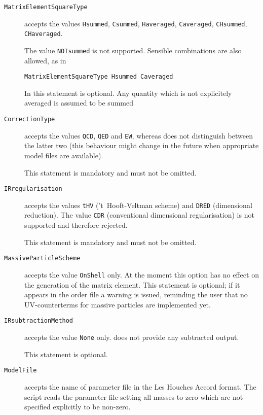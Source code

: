 \begin{description}
\item[\texttt{MatrixElementSquareType}] accepts the values
	\lstinline!Hsummed!, \lstinline!Csummed!,
	\lstinline!Haveraged!, \lstinline!Caveraged!,
	\lstinline!CHsummed!, \lstinline!CHaveraged!.

	The value \lstinline!NOTsummed! is not supported. 
	Sensible combinations are also allowed, as in
\begin{lstlisting}[language=olp]
MatrixElementSquareType Hsummed Caveraged
\end{lstlisting}

        In \gosamv{} this statement is optional.
	Any quantity which is not explicitely averaged is assumed to be
	summed
\item[\texttt{CorrectionType}] accepts the values
        \lstinline!QCD!, \lstinline!QED! and \lstinline!EW!, whereas
	\gosamv{} does not distinguish between the latter two (this behaviour
	might change in the future when appropriate model files are available).

	This statement is mandatory and must not be omitted.
\item[\texttt{IRregularisation}] accepts the values \lstinline!tHV!
        ('t~Hooft-Veltman scheme) and \lstinline!DRED! (dimensional reduction).
	The value \lstinline!CDR! (conventional dimensional regularisation)
	is not supported and therefore rejected.


	This statement is mandatory and must not be omitted.
\item[\texttt{MassiveParticleScheme}] accepts the value \lstinline!OnShell!
	only.
	At the moment this option has no effect on the generation of the matrix
	element. This statement is optional; if it appears in the order file
	a warning is issued, reminding the user that no UV-counterterms for
	massive particles are implemented yet.
\item[\texttt{IRsubtractionMethod}] accepts the value \lstinline!None! only.
	\gosamv{} does not provide any subtracted output.

	This statement is optional.
\item[\texttt{ModelFile}] accepts the name of parameter file in the
	Les Houches Accord format. The script reads the parameter file
	setting all masses to zero which are not specified explicitly
	to be non-zero.


\end{description}
